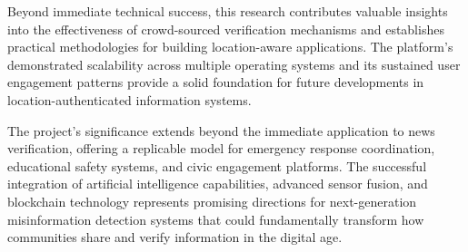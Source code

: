 Beyond immediate technical success, this research contributes valuable insights into the effectiveness of crowd-sourced verification mechanisms and establishes practical methodologies for building location-aware applications. The platform's demonstrated scalability across multiple operating systems and its sustained user engagement patterns provide a solid foundation for future developments in location-authenticated information systems.

The project's significance extends beyond the immediate application to news verification, offering a replicable model for emergency response coordination, educational safety systems, and civic engagement platforms. The successful integration of artificial intelligence capabilities, advanced sensor fusion, and blockchain technology represents promising directions for next-generation misinformation detection systems that could fundamentally transform how communities share and verify information in the digital age.